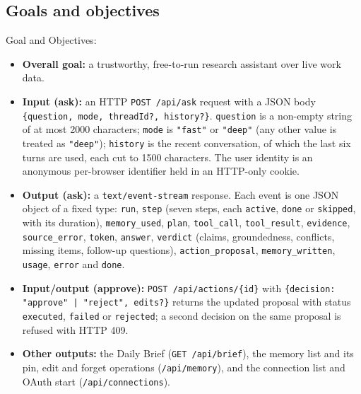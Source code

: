 \documentclass[oneside,a4paper,12pt]{report}
\begin{document}
\subsection{Goals and objectives}
\label{sec:io}
Goal and Objectives:
\begin{itemize}
  	\item \textbf{Overall goal:} a trustworthy, free-to-run research assistant over live work data.
  	\item \textbf{Input (ask):} an HTTP \texttt{POST /api/ask} request with a JSON body \texttt{\{question, mode, threadId?, history?\}}. \texttt{question} is a non-empty string of at most 2000 characters; \texttt{mode} is \texttt{"fast"} or \texttt{"deep"} (any other value is treated as \texttt{"deep"}); \texttt{history} is the recent conversation, of which the last six turns are used, each cut to 1500 characters. The user identity is an anonymous per-browser identifier held in an HTTP-only cookie.
  	\item \textbf{Output (ask):} a \texttt{text/event-stream} response. Each event is one JSON object of a fixed type: \texttt{run}, \texttt{step} (seven steps, each \texttt{active}, \texttt{done} or \texttt{skipped}, with its duration), \texttt{memory\_used}, \texttt{plan}, \texttt{tool\_call}, \texttt{tool\_result}, \texttt{evidence}, \texttt{source\_error}, \texttt{token}, \texttt{answer}, \texttt{verdict} (claims, groundedness, conflicts, missing items, follow-up questions), \texttt{action\_proposal}, \texttt{memory\_written}, \texttt{usage}, \texttt{error} and \texttt{done}.
  	\item \textbf{Input/output (approve):} \texttt{POST /api/actions/\{id\}} with \texttt{\{decision: "approve" | "reject", edits?\}} returns the updated proposal with status \texttt{executed}, \texttt{failed} or \texttt{rejected}; a second decision on the same proposal is refused with HTTP 409.
  	\item \textbf{Other outputs:} the Daily Brief (\texttt{GET /api/brief}), the memory list and its pin, edit and forget operations (\texttt{/api/memory}), and the connection list and OAuth start (\texttt{/api/connections}).
\end{itemize}
\end{document}
